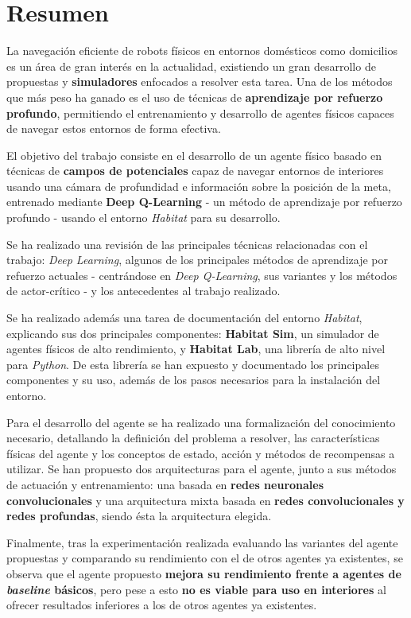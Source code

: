 \chapter*{Resumen}

La navegación eficiente de robots físicos en entornos domésticos como domicilios es un área de gran interés en la actualidad, existiendo un gran desarrollo de propuestas y \textbf{simuladores} enfocados a resolver esta tarea. Una de los métodos que más peso ha ganado es el uso de técnicas de \textbf{aprendizaje por refuerzo profundo}, permitiendo el entrenamiento y desarrollo de agentes físicos capaces de navegar estos entornos de forma efectiva.

El objetivo del trabajo consiste en el desarrollo de un agente físico basado en técnicas de \textbf{campos de potenciales} capaz de navegar entornos de interiores usando una cámara de profundidad e información sobre la posición de la meta, entrenado mediante \textbf{Deep Q-Learning} - un método de aprendizaje por refuerzo profundo - usando el entorno \textit{Habitat} para su desarrollo.

Se ha realizado una revisión de las principales técnicas relacionadas con el trabajo: \textit{Deep Learning}, algunos de los principales métodos de aprendizaje por refuerzo actuales - centrándose en \textit{Deep Q-Learning}, sus variantes y los métodos de actor-crítico - y los antecedentes al trabajo realizado.

Se ha realizado además una tarea de documentación del entorno \textit{Habitat}, explicando sus dos principales componentes: \textbf{Habitat Sim}, un simulador de agentes físicos de alto rendimiento, y \textbf{Habitat Lab}, una librería de alto nivel para \textit{Python}. De esta librería se han expuesto y documentado los principales componentes y su uso, además de los pasos necesarios para la instalación del entorno.

Para el desarrollo del agente se ha realizado una formalización del conocimiento necesario, detallando la definición del problema a resolver, las características físicas del agente y los conceptos de estado, acción y métodos de recompensas a utilizar. Se han propuesto dos arquitecturas para el agente, junto a sus métodos de actuación y entrenamiento: una basada en \textbf{redes neuronales convolucionales} y una arquitectura mixta basada en \textbf{redes convolucionales y redes profundas}, siendo ésta la arquitectura elegida.

Finalmente, tras la experimentación realizada evaluando las variantes del agente propuestas y comparando su rendimiento con el de otros agentes ya existentes, se observa que el agente propuesto \textbf{mejora su rendimiento frente a agentes de \textit{baseline} básicos}, pero pese a esto \textbf{no es viable para uso en interiores} al ofrecer resultados inferiores a los de otros agentes ya existentes.

